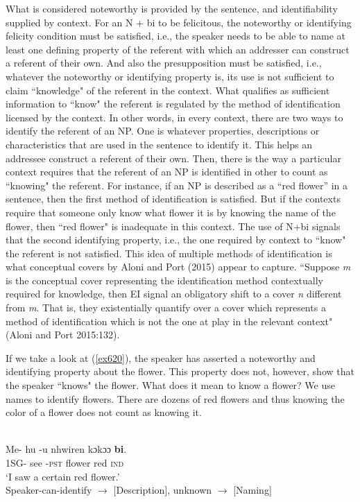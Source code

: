 \documentclass[output=paper,modfonts]{langsci/langscibook}
\begin{document}
 \z\z What is considered noteworthy is provided by the sentence, and identifiability supplied by context. 
For an N + bi to be felicitous, the noteworthy or identifying felicity condition must be satisfied, i.e., the speaker needs to be able to name at least one defining property of the referent with which an addresser can construct a referent of their own. And also the presupposition must be satisfied, i.e., whatever the noteworthy or identifying property is, its use is not sufficient to claim ``knowledge" of the referent in the context. What qualifies as sufficient information to ``know" the referent is regulated by the method of identification licensed by the context. In other words, in every context, there are two ways to identify the referent of an NP. One is whatever properties, descriptions or characteristics that are used in the sentence to identify it. This helps an addressee construct a referent of their own. Then, there is the way a particular context requires that the referent of an NP is identified in other to count as ``knowing" the referent. For instance, if an NP is described as a ``red flower'' in a sentence, then the first method of identification is satisfied. But if the contexts require that someone only know what flower it is by knowing the name of the flower, then ``red flower" is inadequate in this context. The use of N+bi signals that the second identifying property, i.e., the one required by context to ``know" the referent is not satisfied. This idea of multiple methods of identification is what conceptual covers by Aloni and Port (2015) appear to capture. ``Suppose \emph{m} is the conceptual cover representing the identification method contextually required for knowledge, then EI signal an obligatory shift to a cover \emph{n} different from \emph{m}. That is, they existentially quantify over a cover which represents a method of identification which is not the one at play in the relevant context" (Aloni and Port 2015:132). 

If we take a look at (\ref{ex620}), the speaker has asserted a noteworthy and identifying property about the flower.  This property does not, however, show that the speaker ``knows" the flower. What does it mean to know a flower? We use names to identify flowers. There are dozens of red flowers and thus knowing the color of a flower does not count as knowing it. 


\ea\label{ex620}\\
\gll Me- hu -u nhwiren kɔkɔɔ \textbf{bi}.\\
 1SG- see -\textsc{pst}  flower red \textsc{ind} \\
\glt `I saw a certain red flower.'\\
Speaker-can-identify $\rightarrow$ [Description], unknown $\rightarrow$  [Naming]
\end{document}
